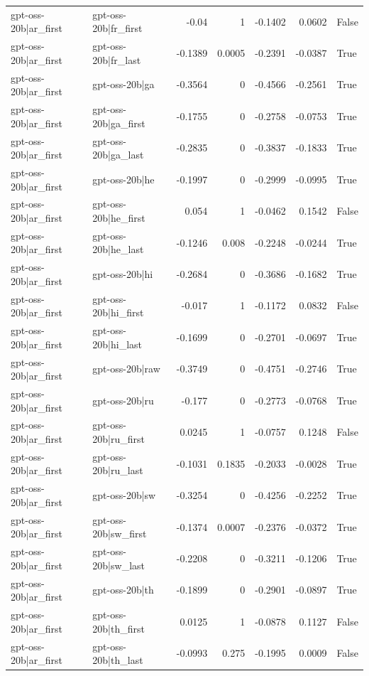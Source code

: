 \begin{table}
\begin{tabular}{l l r r r r l}
gpt-oss-20b|ar_first & gpt-oss-20b|fr_first & -0.04 & 1 & -0.1402 & 0.0602 & False \\
gpt-oss-20b|ar_first & gpt-oss-20b|fr_last & -0.1389 & 0.0005 & -0.2391 & -0.0387 & True \\
gpt-oss-20b|ar_first & gpt-oss-20b|ga & -0.3564 & 0 & -0.4566 & -0.2561 & True \\
gpt-oss-20b|ar_first & gpt-oss-20b|ga_first & -0.1755 & 0 & -0.2758 & -0.0753 & True \\
gpt-oss-20b|ar_first & gpt-oss-20b|ga_last & -0.2835 & 0 & -0.3837 & -0.1833 & True \\
gpt-oss-20b|ar_first & gpt-oss-20b|he & -0.1997 & 0 & -0.2999 & -0.0995 & True \\
gpt-oss-20b|ar_first & gpt-oss-20b|he_first & 0.054 & 1 & -0.0462 & 0.1542 & False \\
gpt-oss-20b|ar_first & gpt-oss-20b|he_last & -0.1246 & 0.008 & -0.2248 & -0.0244 & True \\
gpt-oss-20b|ar_first & gpt-oss-20b|hi & -0.2684 & 0 & -0.3686 & -0.1682 & True \\
gpt-oss-20b|ar_first & gpt-oss-20b|hi_first & -0.017 & 1 & -0.1172 & 0.0832 & False \\
gpt-oss-20b|ar_first & gpt-oss-20b|hi_last & -0.1699 & 0 & -0.2701 & -0.0697 & True \\
gpt-oss-20b|ar_first & gpt-oss-20b|raw & -0.3749 & 0 & -0.4751 & -0.2746 & True \\
gpt-oss-20b|ar_first & gpt-oss-20b|ru & -0.177 & 0 & -0.2773 & -0.0768 & True \\
gpt-oss-20b|ar_first & gpt-oss-20b|ru_first & 0.0245 & 1 & -0.0757 & 0.1248 & False \\
gpt-oss-20b|ar_first & gpt-oss-20b|ru_last & -0.1031 & 0.1835 & -0.2033 & -0.0028 & True \\
gpt-oss-20b|ar_first & gpt-oss-20b|sw & -0.3254 & 0 & -0.4256 & -0.2252 & True \\
gpt-oss-20b|ar_first & gpt-oss-20b|sw_first & -0.1374 & 0.0007 & -0.2376 & -0.0372 & True \\
gpt-oss-20b|ar_first & gpt-oss-20b|sw_last & -0.2208 & 0 & -0.3211 & -0.1206 & True \\
gpt-oss-20b|ar_first & gpt-oss-20b|th & -0.1899 & 0 & -0.2901 & -0.0897 & True \\
gpt-oss-20b|ar_first & gpt-oss-20b|th_first & 0.0125 & 1 & -0.0878 & 0.1127 & False \\
gpt-oss-20b|ar_first & gpt-oss-20b|th_last & -0.0993 & 0.275 & -0.1995 & 0.0009 & False \\

\end{tabular}
\end{table}
